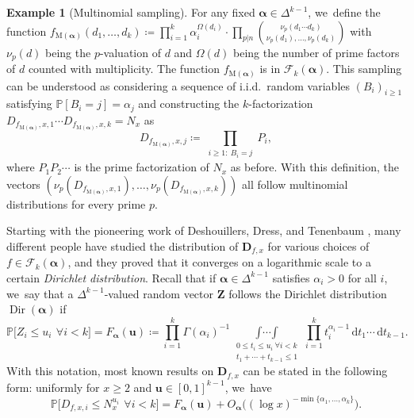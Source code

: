 \documentclass[JEP,XML,SOM,Unicode,published]{cedram}
\newcommand{\bu}{{\boldsymbol u}}
\newcommand{\bD}{{\boldsymbol D}}
\newcommand{\bZ}{{\boldsymbol Z}}
\newcommand{\PP}{\mathbb{P}}
\newcommand{\boldalpha}{\boldsymbol{\alpha}}
\newcommand{\dee}{\,\mathrm{d}}
\newcommand{\simplex}{\Delta^{k-1}}
\newcommand{\bg}{\big}
\DeclareMathOperator{\Dir}{Dir}
\theoremstyle{plain}
\theoremstyle{definition}
\newtheorem{example}{Example}
\begin{document}
\begin{example}[Multinomial sampling]
\label{ex:multinomial sampling}
For any fixed $\boldalpha \in \simplex$, we~define the function $f_{\mathrm M(\boldalpha)}(d_1, \ldots, d_k) \coloneqq \prod_{i=1}^{k} \alpha_i^{\Omega(d_i)} \cdot \prod_{p|n} \binom{\nu_p(d_1\cdots d_k)}{\nu_p(d_1), \ldots, \nu_p(d_k)}$ with $\nu_p(d)$ being the $p$\nobreakdash-valuation of $d$ and $\Omega(d)$ being the number of prime factors of $d$ counted with multiplicity. The function $f_{\mathrm M(\boldalpha)}$ is in $\mathcal F_k(\boldalpha)$. This sampling can be understood as considering a sequence of i.i.d.~random variables $(B_i)_{i \ge 1}$ satisfying $\PP[B_i = j] = \alpha_j$ and constructing the $k$-factorization $D_{f_{\mathrm M(\boldalpha)}, x,1}\cdots D_{f_{\mathrm M(\boldalpha)}, x,k} = N_x$ as
\[
D_{f_{\mathrm M(\boldalpha)}, x,j} \coloneqq \prod_{\substack{i\ge 1:\ B_i = j}} P_i,
\]
where $P_1 P_2 \cdots$ is the prime factorization of $N_x$ as before. With this definition, the vectors $(\nu_p(D_{f_{\mathrm M(\boldalpha)}, x,1}), \dots, \nu_p(D_{f_{\mathrm M(\boldalpha)}, x,k}))$ all follow multinomial distributions for every prime $p$.
\end{example}

Starting with the pioneering work of Deshouillers, Dress, and Tenenbaum \cite{DDT79}, many different people have studied the distribution of $\bD_{f, x}$ for various choices of $f \in \mathcal F_k(\boldalpha)$, and they proved that it converges on a logarithmic scale to a certain {\it Dirichlet distribution}. Recall that if $\boldalpha \in \simplex$ satisfies $\alpha_i > 0$ for all $i$, we~say that a $\simplex$-valued random vector $\bZ$ follows the Dirichlet distribution $\Dir(\boldalpha)$ if
\[
\PP\bg[Z_i \le u_i\ \, \forall i<k\bg] = F_{\boldalpha}(\bu) \coloneqq \prod_{i=1}^{k} \Gamma(\alpha_i)^{-1} \mathop{\int\cdots\int}\limits_{\substack{0 \le t_i \le u_i \ \forall i < k \\ t_1 + \cdots + t_{k-1} \le 1}} \prod_{i=1}^k t_i^{\alpha_i - 1} \dee t_1\cdots \dee t_{k-1}.
\]
With this notation, most known results on $\bD_{f, x}$ can be stated in the following form: uniformly for $x \ge 2$ and $\bu \in [0, 1]^{k-1}$, we~have
\begin{equation}
\label{eq:previous result on k fact}
\PP\bg[D_{f, x, i} \le N_x^{u_i}\ \, \forall i < k\bg] = F_{\boldalpha}(\bu) + O_{\boldalpha}\bg((\log x)^{-\min\{\alpha_1, \ldots, \alpha_{k}\}}\bg).
\end{equation}
\end{document}
